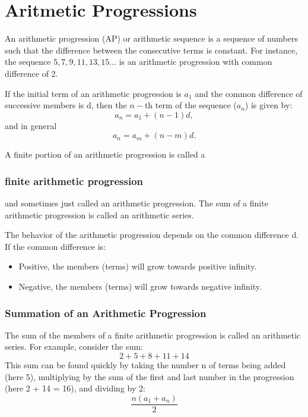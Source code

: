\documentclass[]{report}
\begin{document}
\section{Aritmetic Progressions}

An arithmetic progression (AP) or arithmetic sequence is a sequence of numbers such that the difference between the consecutive terms is constant. For instance, the sequence $5, 7, 9, 11, 13, 15 \ldots$ is an arithmetic progression with common difference of 2.




If the initial term of an arithmetic progression is $a_{1}$ and the common difference of successive members is d, then the $n-$th term of the sequence ($a_{n}$) is given by:
\[ a_{n}=a_{1}+(n-1)d, \] 
and in general
\[ a_{n}=a_{m}+(n-m)d.\]



A finite portion of an arithmetic progression is called a \subsubsection{finite arithmetic progression} and sometimes just called an arithmetic progression. The sum of a finite arithmetic progression is called an arithmetic series.
\newline


The behavior of the arithmetic progression depends on the common difference d. If the common difference is:
\begin{itemize}
\item Positive, the members (terms) will grow towards positive infinity.
\item Negative, the members (terms) will grow towards negative infinity.
\end{itemize}


\subsubsection{Summation of an Arithmetic Progression}
The sum of the members of a finite arithmetic progression is called an arithmetic series. For example, consider the sum:
\[2+5+8+11+14\]
This sum can be found quickly by taking the number n of terms being added (here 5), multiplying by the sum of the first and last number in the progression (here 2 + 14 = 16), and dividing by 2:
\[{\frac  {n(a_{1}+a_{n})}{2}}\]
\end{document}
